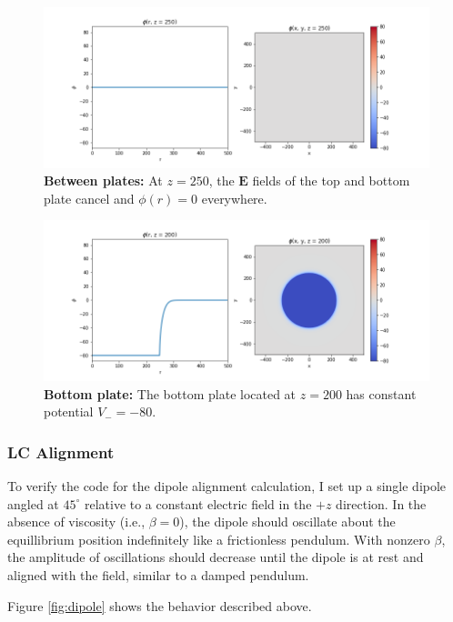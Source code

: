 \documentclass[twocolumn,aps,prl]{revtex4-1} %
\begin{document}
\begin{figure}
	\centering    
    \includegraphics[scale=0.52]{between_plates.png}
    \caption{\textbf{Between plates:} At $z=250$, the $\textbf{E}$ fields of the top and bottom plate cancel and $\phi(r) = 0$ everywhere. }
    \label{fig:between_plates}
\end{figure}

\begin{figure}
	\centering    
    \includegraphics[scale=0.52]{bottom_plate.png}
    \caption{\textbf{Bottom plate:} The bottom plate located at $z=200$ has constant potential $V_- = -80$. }
    \label{fig:bottom_plate}
\end{figure}

\subsubsection{LC Alignment}
To verify the code for the dipole alignment calculation, I set up a single dipole angled at $45^{\circ}$ relative to a constant electric field in the $+z$ direction.  In the absence of viscosity (i.e., $\beta = 0$), the dipole should oscillate about the equillibrium position indefinitely like a frictionless pendulum.  With nonzero $\beta$, the amplitude of oscillations should decrease until the dipole is at rest and aligned with the field, similar to a damped pendulum.  

Figure \ref{fig:dipole} shows the behavior described above.
\end{document}

